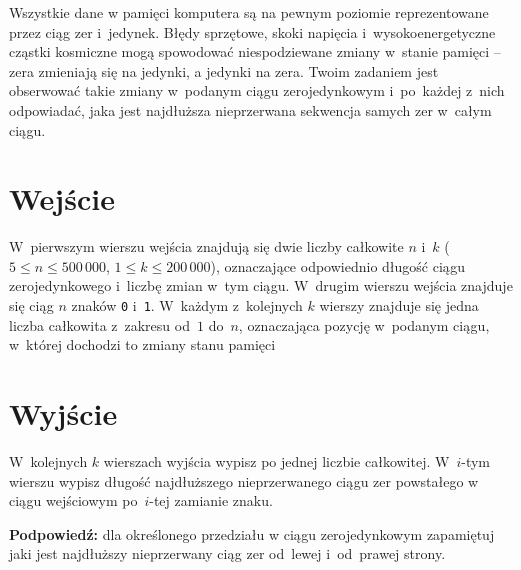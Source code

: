 \documentclass{spiral-kurs}
\begin{document}
\makeheader
%
	Wszystkie dane w pamięci komputera są na pewnym poziomie reprezentowane
	przez ciąg zer i~jedynek. Błędy sprzętowe, skoki napięcia
	i~wysokoenergetyczne cząstki kosmiczne mogą spowodować niespodziewane
	zmiany w~stanie pamięci -- zera zmieniają się na jedynki, a jedynki
	na zera. Twoim zadaniem jest obserwować takie zmiany w~podanym ciągu
	zerojedynkowym i~po~każdej z~nich odpowiadać, jaka jest najdłuższa
	nieprzerwana sekwencja samych zer w~całym ciągu.

	\section{Wejście}
	W~pierwszym wierszu wejścia znajdują się dwie liczby całkowite $n$
	i~$k$ ($5 \leq n \leq 500\,000$, $1 \leq k \leq 200\,000$), oznaczające
	odpowiednio długość ciągu zerojedynkowego i~liczbę zmian w~tym ciągu.
	W~drugim wierszu wejścia znajduje się ciąg $n$ znaków \texttt{0}
	i~\texttt{1}. W~każdym z~kolejnych $k$ wierszy znajduje się jedna liczba
	całkowita z~zakresu od~$1$ do~$n$, oznaczająca pozycję w~podanym ciągu,
	w~której dochodzi to zmiany stanu pamięci

	\section{Wyjście}
	W~kolejnych $k$ wierszach wyjścia wypisz po jednej liczbie całkowitej.
	W~$i$-tym wierszu wypisz długość najdłuższego nieprzerwanego ciągu zer
	powstałego w ciągu wejściowym po~$i$-tej zamianie znaku.

	\vspace{-4pt}

	\noindent
	\textbf{Podpowiedź:} dla określonego przedziału w ciągu zerojedynkowym
	zapamiętuj jaki jest najdłuższy nieprzerwany ciąg zer od~lewej
	i~od~prawej strony.
\end{document}
